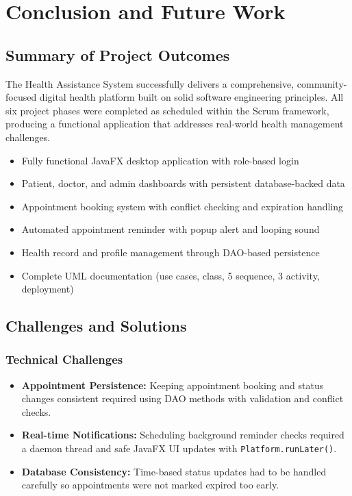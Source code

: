 \documentclass[12pt,a4paper]{report}
\begin{document}
\chapter{Conclusion and Future Work}

\section{Summary of Project Outcomes}

The Health Assistance System successfully delivers a comprehensive, community-focused digital health platform built on solid software engineering principles. All six project phases were completed as scheduled within the Scrum framework, producing a functional application that addresses real-world health management challenges.

\begin{tcolorbox}[successbox, title={Key Achievements}]
\begin{itemize}[leftmargin=1.2cm]
  \item Fully functional JavaFX desktop application with role-based login
  \item Patient, doctor, and admin dashboards with persistent database-backed data
  \item Appointment booking system with conflict checking and expiration handling
  \item Automated appointment reminder with popup alert and looping sound
  \item Health record and profile management through DAO-based persistence
  \item Complete UML documentation (use cases, class, 5 sequence, 3 activity, deployment)
\end{itemize}
\end{tcolorbox}

\section{Challenges and Solutions}

\subsection{Technical Challenges}

\begin{itemize}[leftmargin=1.5cm]
  \item \textbf{Appointment Persistence:} Keeping appointment booking and status changes consistent required using DAO methods with validation and conflict checks.
  \item \textbf{Real-time Notifications:} Scheduling background reminder checks required a daemon thread and safe JavaFX UI updates with \texttt{Platform.runLater()}.
  \item \textbf{Database Consistency:} Time-based status updates had to be handled carefully so appointments were not marked expired too early.
\end{itemize}
\end{document}
